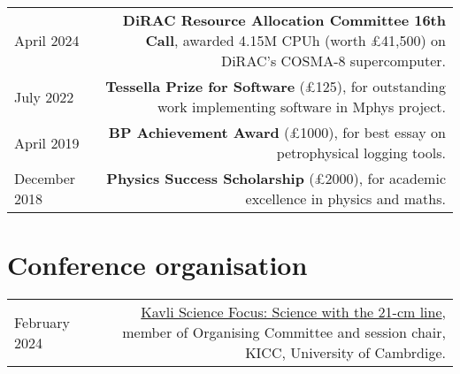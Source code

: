 \documentclass{article}
\begin{document}
\begin{tabular}{L!{\vrule}R}

    April 2024 & \textbf{DiRAC Resource Allocation Committee 16th Call}, awarded 4.15M CPUh (worth £41,500) on DiRAC's COSMA-8 supercomputer. \\
    July 2022 & \textbf{Tessella Prize for Software} (£125), for outstanding work implementing software in Mphys project. \\
    April 2019 & \textbf{BP Achievement Award} (£1000), for best essay on petrophysical logging tools. \\
    December 2018 & \textbf{Physics Success Scholarship} (£2000), for academic excellence in physics and maths.\\

\end{tabular}

\begin{comment}
\section*{Posters Presentations}

\begin{tabular}{L!{\vrule}R}
	March 2021 & \href{https://github.com/htjb/Talks/blob/master/Posters/SKA_globalemu_March_2021/globalemu.pdf}{\textit{globalemu: A novel and robust approach for emulating the sky averaged 21-cm signal from the cosmic dawn and epoch of reionization}}, A Precursor View of the SKA Sky, Virtual Conference\\
	December 2019 & \href{https://drive.google.com/file/d/1dvgumyu4cXxXqoYxikU3DKOa4u_gpGzn/view}{\textit{REACH: Radio Experiment for the Analysis of Cosmic Hydrogen}}, Science At Low Frequencies VI, Arizona State University \\
	November 2019 & \href{https://github.com/htjb/Talks/blob/master/Posters/Cav_Graduate_Conf_REACH_Nov_2019/REACH_poster.pdf}{\textit{REACH: Radio Experiment for the Analysis of Cosmic Hydrogen}}, Cavendish Graduate Conference, University of Cambridge
\end{tabular}
\end{comment}

\section*{Conference organisation}

\begin{tabular}{L!{\vrule}R}
  February 2024  &\href{https://www.kicc.cam.ac.uk/events/kavli-science-themed-meetings/science-21-cm-hydrogen-line}{Kavli Science Focus: Science with the 21-cm line}, member of Organising Committee and session chair, KICC, University of Cambrdige. \\
\end{tabular}
\end{document}
